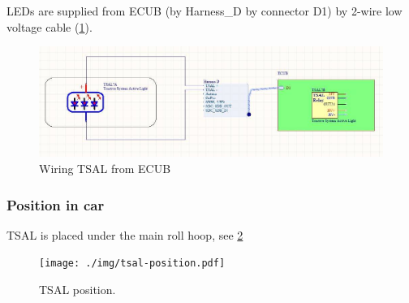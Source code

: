 LEDs are supplied from ECUB (by Harness\_D by connector D1) by 2-wire low voltage cable (\ref{fig:TSAL-wiring}).

\begin{figure}[H]
	\centering
	\includegraphics[width=\textwidth,]{./img/tsal-wiring.jpg}
	\caption{Wiring TSAL from ECUB}
	\label{fig:TSAL-wiring}
\end{figure}

\subsubsection{Position in car}
TSAL is placed under the main roll hoop, see \ref{fig:TSAL-position}

\begin{figure}[H]
	\centering
	\texttt{[image: ./img/tsal-position.pdf]}
	\caption{TSAL position.}
	\label{fig:TSAL-position}
\end{figure}
